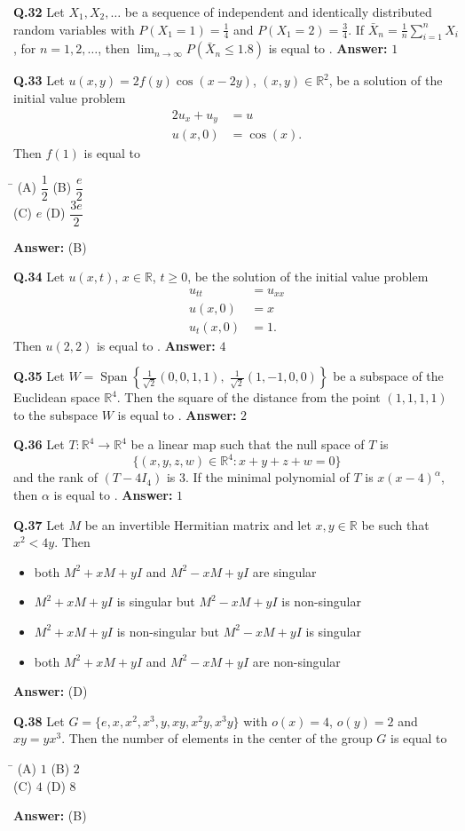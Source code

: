 \documentclass[11pt,a4paper]{article}
\newcommand{\optsfourA}[4]{%
  \begin{tabbing}
    \hspace{0.48\linewidth}\=\kill
    (A) #1 \> (B) #2 \\[2pt]
    (C) #3 \> (D) #4
  \end{tabbing}%
}
\newcommand{\optslistA}[4]{%
  \begin{itemize}
    \setlength{\itemsep}{2pt}\setlength{\parskip}{0pt}
    \item[(A)] #1
    \item[(B)] #2
    \item[(C)] #3
    \item[(D)] #4
  \end{itemize}%
}
\newcommand{\ans}[1]{\textbf{Answer:} #1\par\medskip}
\begin{document}
\textbf{Q.32} Let $X_1, X_2, \dots$ be a sequence of independent and identically distributed random variables with $P(X_1 = 1) = \frac{1}{4}$ and $P(X_1 = 2) = \frac{3}{4}$. If $\bar{X}_n = \frac{1}{n} \sum_{i=1}^{n} X_i$, for $n = 1, 2, \dots$, then $\lim_{n\to\infty} P(\bar{X}_n \le 1.8)$ is equal to \underline{\hspace{2cm}}.
\ans{$1$}

\textbf{Q.33} Let $u(x, y) = 2f(y)\cos(x - 2y)$, $(x, y) \in \mathbb{R}^2$, be a solution of the initial value problem
\begin{align*}
  2u_x + u_y &= u \\
  u(x, 0) &= \cos(x).
\end{align*}
Then $f(1)$ is equal to
\optsfourA{$\dfrac{1}{2}$}{$\dfrac{e}{2}$}{$e$}{$\dfrac{3e}{2}$}
\ans{(B)}

\textbf{Q.34} Let $u(x, t)$, $x \in \mathbb{R}$, $t \ge 0$, be the solution of the initial value problem
\begin{align*}
  u_{tt} &= u_{xx} \\
  u(x, 0) &= x \\
  u_t(x, 0) &= 1.
\end{align*}
Then $u(2, 2)$ is equal to \underline{\hspace{2cm}}.
\ans{$4$}

\textbf{Q.35} Let $W = \operatorname{Span}\left\{\frac{1}{\sqrt{2}}(0, 0, 1, 1),\; \frac{1}{\sqrt{2}}(1, -1, 0, 0)\right\}$ be a subspace of the Euclidean space $\mathbb{R}^4$. Then the square of the distance from the point $(1, 1, 1, 1)$ to the subspace $W$ is equal to \underline{\hspace{2cm}}.
\ans{$2$}

\textbf{Q.36} Let $T : \mathbb{R}^4 \to \mathbb{R}^4$ be a linear map such that the null space of $T$ is
\[
  \{(x, y, z, w) \in \mathbb{R}^4 : x + y + z + w = 0\}
\]
and the rank of $(T - 4I_4)$ is $3$. If the minimal polynomial of $T$ is $x(x - 4)^\alpha$, then $\alpha$ is equal to \underline{\hspace{2cm}}.
\ans{$1$}

\textbf{Q.37} Let $M$ be an invertible Hermitian matrix and let $x, y \in \mathbb{R}$ be such that $x^2 < 4y$. Then
\optslistA{both $M^2 + xM + yI$ and $M^2 - xM + yI$ are singular}{$M^2 + xM + yI$ is singular but $M^2 - xM + yI$ is non-singular}{$M^2 + xM + yI$ is non-singular but $M^2 - xM + yI$ is singular}{both $M^2 + xM + yI$ and $M^2 - xM + yI$ are non-singular}
\ans{(D)}

\textbf{Q.38} Let $G = \{e, x, x^2, x^3, y, xy, x^2y, x^3y\}$ with $o(x) = 4$, $o(y) = 2$ and $xy = yx^3$. Then the number of elements in the center of the group $G$ is equal to
\optsfourA{$1$}{$2$}{$4$}{$8$}
\ans{(B)}
\end{document}
